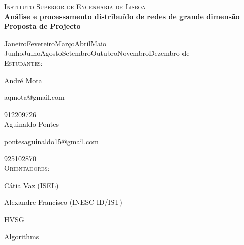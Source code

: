 \documentclass[a4paper,10pt]{report}
\begin{document}
\vskip0.5cm                
\begin{center}
  {\LARGE \textsc{Instituto Superior de Engenharia de Lisboa}}
  \\[1cm]
  {\huge \bf Análise e processamento distribuído de redes de grande dimensão}
  \\[0.5cm]
  {\large {\bf Proposta de Projecto}}
  
  {\large
    \ifcase\month\or Janeiro\or Fevereiro\or Mar\c{c}o\or Abril\or Maio\or
      Junho\or Julho\or Agosto\or Setembro\or Outubro\or Novembro\or Dezembro
    \fi
    \space de\space\the\year}
    \\[0.5cm]
    \textsc{Estudantes:}
    
    André Mota
    
    aqmota@gmail.com
    
    912209726
    \\[0.25cm]
    Aguinaldo Pontes
    
    pontesaguinaldo15@gmail.com
    
    925102870
    \\[0.5cm]
    \textsc{Orientadores:}
    
    Cátia Vaz (ISEL)
    
    Alexandre Francisco (INESC-ID/IST)

\end{center}


\tableofcontents



{HVSG}

{Algorithms}





\end{document}
